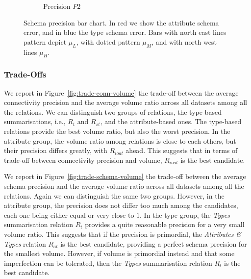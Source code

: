 \begin{figure}
\begin{subfigure}{.8\textwidth}
{
		}
		\caption{Precision $P2$}
	\end{subfigure}
	\caption{Schema precision bar chart. In red we show the attribute schema error, and in blue the type schema error. Bars with north east lines pattern depict $\mu_{L}$, with dotted pattern $\mu_{M}$, and with north west lines $\mu_{H}$.}
	\label{fig:schema-precision-bar}
\end{figure}

\subsubsection{Trade-Offs}

We report in Figure~\ref{fig:trade-conn-volume} the trade-off between the average connectivity precision and the average volume ratio across all datasets among all the relations. We can distinguish two groups of relations, the type-based summarisations, i.e., $R_t$ and $R_{st}$, and the attribute-based ones.
The type-based relations provide the best volume ratio, but also the worst precision. In the attribute group, the volume ratio among relations is close to each others, but their precision differs greatly, with $R_{ioat}$ ahead. This suggests that in terms of trade-off between connectivity precision and volume, $R_{ioat}$ is the best candidate.

We report in Figure~\ref{fig:trade-schema-volume} the trade-off between the average schema precision and the average volume ratio across all datasets among all the relations. Again we can distinguish the same two groups. However, in the attribute group, the precision does not differ too much among the candidates, each one being either equal or very close to $1$. In the type group, the \emph{Types} summarisation relation $R_t$ provides a quite reasonable precision for a very small volume ratio. This suggests that if the precision is primordial, the \emph{Attributes \& Types} relation $R_{at}$ is the best candidate, providing a perfect schema precision for the smallest volume. However, if volume is primordial instead and that some imperfection can be tolerated, then the \emph{Types} summarisation relation $R_t$ is the best candidate.

